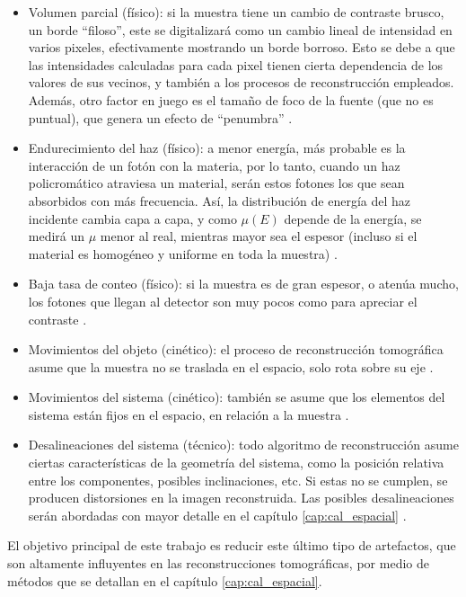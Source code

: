 \begin{itemize}
    \item Volumen parcial (físico): si la muestra tiene un cambio de contraste brusco, un
    borde ``filoso'', este se digitalizará como un cambio lineal de intensidad en varios
    pixeles, efectivamente mostrando un borde borroso. Esto se debe a que las
    intensidades calculadas para cada pixel tienen cierta dependencia de los valores de
    sus vecinos, y también a los procesos de reconstrucción empleados. Además, otro factor
    en juego es el tamaño de foco de la fuente (que no es puntual), que genera un efecto
    de ``penumbra'' \cite{Buzug2008}.
    \item Endurecimiento del haz (físico): a menor energía, más probable es la
    interacción de un fotón con la materia, por lo tanto, cuando un haz policromático
    atraviesa un material, serán estos fotones los que sean absorbidos con más frecuencia.
    Así, la distribución de energía del haz incidente cambia capa a capa, y como $\mu(E)$
    depende de la energía, se medirá un $\mu$ menor al real, mientras mayor sea el
    espesor (incluso si el material es homogéneo y uniforme en toda la muestra) \cite{Buzug2008}.
    \item Baja tasa de conteo (físico): si la muestra es de gran espesor, o atenúa mucho,
    los fotones que llegan al detector son muy pocos como para apreciar el contraste \cite{Buzug2008}. 
    \item Movimientos del objeto (cinético): el proceso de reconstrucción tomográfica asume
    que la muestra no se traslada en el espacio, solo rota sobre su eje \cite{Buzug2008}. 
    \item Movimientos del sistema (cinético): también se asume que los elementos del sistema
    están fijos en el espacio, en relación a la muestra \cite{Buzug2008}. 
    \item Desalineaciones del sistema (técnico): todo algoritmo de reconstrucción asume ciertas
    características de la geometría del sistema, como la posición relativa entre los componentes,
    posibles inclinaciones, etc. Si estas no se cumplen, se producen distorsiones en la imagen
    reconstruida. Las posibles desalineaciones serán abordadas con mayor detalle en el capítulo
    \ref{cap:cal_espacial} \cite{Buzug2008} \cite{Sun2006}.
\end{itemize}

El objetivo principal de este trabajo es reducir este último tipo de artefactos, que son
altamente influyentes en las reconstrucciones tomográficas, por medio de métodos que se
detallan en el capítulo \ref{cap:cal_espacial}.

